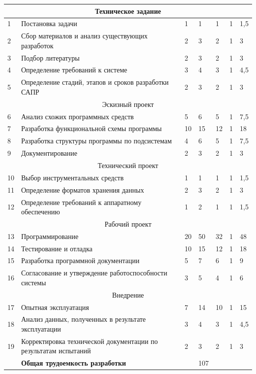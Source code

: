 \begin{longtable}[h]{|p{}|p{}|p{}|p{}|p{}|p{}|p{}|}
  \multicolumn{7}{|c|}{Техническое задание} \\ \hline
  1 & Постановка задачи & 1 & 1 & 1 & 1 & 1,5 \\ \hline
  2 & Сбор материалов и анализ существующих разработок & 2 & 3 & 2 & 1 & 3 \\ \hline
  3 & Подбор литературы & 2 & 3 & 2 & 1 & 3 \\ \hline
  4 & Определение требований к системе & 3 & 4 & 3 & 1 & 4,5 \\ \hline
  5 & Определение стадий, этапов и сроков разработки САПР & 2 & 3 & 2 & 1 & 3 \\ \hline
  \multicolumn{7}{|c|}{Эскизный проект} \\ \hline
  6 & Анализ схожих программных средств & 5 & 6 & 5 & 1 & 7,5 \\ \hline
  7 & Разработка функциональной схемы программы & 10 & 15 & 12 & 1 & 18 \\ \hline
  8 & Разработка структуры программы по подсистемам & 4 & 6 & 5 & 1 & 7,5 \\ \hline
  9 & Документирование & 2 & 3 & 2 & 1 & 3 \\ \hline
  \multicolumn{7}{|c|}{Технический проект} \\ \hline
  10 & Выбор инструментальных средств & 1 & 1 & 1 & 1 & 1,5 \\ \hline
  11 & Определение форматов хранения данных & 2 & 3 & 2 & 1 & 3 \\ \hline
  12 & Определение требований к аппаратному обеспечению & 1 & 2 & 1 & 1 & 1,5 \\ \hline
  \multicolumn{7}{|c|}{Рабочий проект} \\ \hline
  13 & Программирование & 20 & 50 & 32 & 1 & 48 \\ \hline
  14 & Тестирование и отладка & 10 & 15 & 12 & 1 & 18 \\ \hline
  15 & Разработка программной документации & 5 & 7 & 6 & 1 & 9 \\ \hline
  16 & Согласование и утверждение работоспособности системы & 3 & 5 & 4 & 1 & 6 \\ \hline
  \multicolumn{7}{|c|}{Внедрение} \\ \hline
  17 & Опытная эксплуатация & 7 & 14 & 10 & 1 & 15 \\ \hline
  18 & Анализ данных, полученных в результате эксплуатации & 3 & 4 & 3 & 1 & 4,5 \\ \hline
  19 & Корректировка технической документации по результатам испытаний & 2 & 3 & 2 & 1 & 3 \\ \hline
     & \textbf{Общая трудоемкость разработки} & & 107 & & & \\ \hline
\end{longtable}
\normalsize


